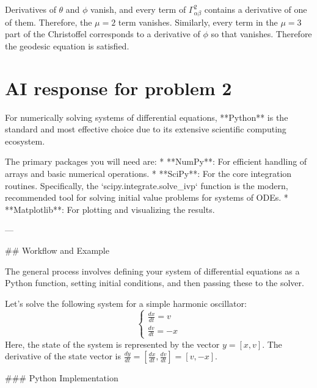 \documentclass[11pt, letterpaper]{article}
\theoremstyle{plain}
\begin{document}
Derivatives of $\theta $ and $\phi $ vanish, and every term of $\Gamma^2_{\alpha \beta } $ contains a derivative of one of them. Therefore, the $\mu =2$ term vanishes. Similarly, every term in the $\mu =3$ part of the Christoffel corresponds to a derivative of $\phi $ so that vanishes. Therefore the geodesic equation is satisfied.








\newpage
\section{AI response for problem 2}

For numerically solving systems of differential equations, **Python** is the standard and most effective choice due to its extensive scientific computing ecosystem.

The primary packages you will need are:
* **NumPy**: For efficient handling of arrays and basic numerical operations.
* **SciPy**: For the core integration routines. Specifically, the `scipy.integrate.solve\_ivp` function is the modern, recommended tool for solving initial value problems for systems of ODEs.
* **Matplotlib**: For plotting and visualizing the results.

---

\#\# Workflow and Example

The general process involves defining your system of differential equations as a Python function, setting initial conditions, and then passing these to the solver.

Let's solve the following system for a simple harmonic oscillator:
$$
\begin{cases}
\frac{dx}{dt} = v \\
\frac{dv}{dt} = -x
\end{cases}
$$
Here, the state of the system is represented by the vector $y = [x, v]$. The derivative of the state vector is $\frac{dy}{dt} = \left[ \frac{dx}{dt}, \frac{dv}{dt} \right] = [v, -x]$.

\#\#\# Python Implementation
\end{document}
